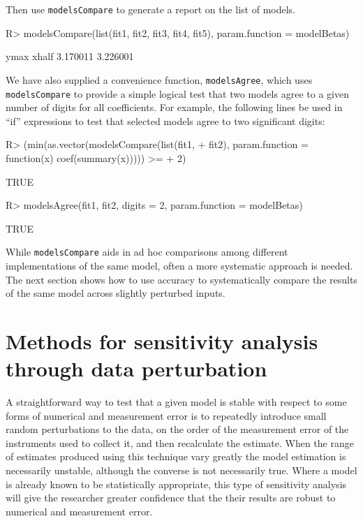 \documentclass[11pt]{article}
\let\code=\texttt
\newcommand{\pkg}[1]{{\normalfont\fontseries{b}\selectfont #1}}
\begin{document}
Then use \code{modelsCompare} to generate a report on the list of models.

\begin{Schunk}
\begin{Sinput}
R> modelsCompare(list(fit1, fit2, fit3, fit4, fit5), param.function = modelBetas)
\end{Sinput}
\begin{Soutput}
    ymax    xhalf 
3.170011 3.226001 
\end{Soutput}
\end{Schunk}


We have also supplied a convenience function, \code{modelsAgree}, which uses \code{modelsCompare} to provide a simple logical test that two models agree
to a given number of digits for all coefficients. For example, the following lines
 be used in ``if'' expressions to test that selected models agree to two 
 significant digits:                                 

\begin{Schunk}
\begin{Sinput}
R> (min(as.vector(modelsCompare(list(fit1, 
+     fit2), param.function = function(x) coef(summary(x))))) >= 
+     2)
\end{Sinput}
\begin{Soutput}
[1] TRUE
\end{Soutput}
\begin{Sinput}
R> modelsAgree(fit1, fit2, digits = 2, param.function = modelBetas)
\end{Sinput}
\begin{Soutput}
[1] TRUE
\end{Soutput}
\end{Schunk}

While \code{modelsCompare} aids in ad hoc comparisons among different implementations of the same model, often a more systematic approach is needed. The next section shows how to use \pkg{accuracy} to systematically compare the results of the same model across slightly perturbed inputs. 

\section{Methods for sensitivity analysis through data perturbation}

A straightforward way to test that a given model is stable with respect to
some forms of numerical and measurement error is 
to repeatedly introduce small random perturbations to the data, on the order of the measurement error of the instruments used to collect it, and then recalculate the estimate. When the range of estimates produced using 
this technique vary greatly the model estimation is necessarily unstable, although
the converse is not necessarily true. Where a model is already known to be statistically appropriate,
this type of sensitivity analysis will give the researcher greater confidence that the their 
results are robust to numerical and measurement error.
\end{document}
